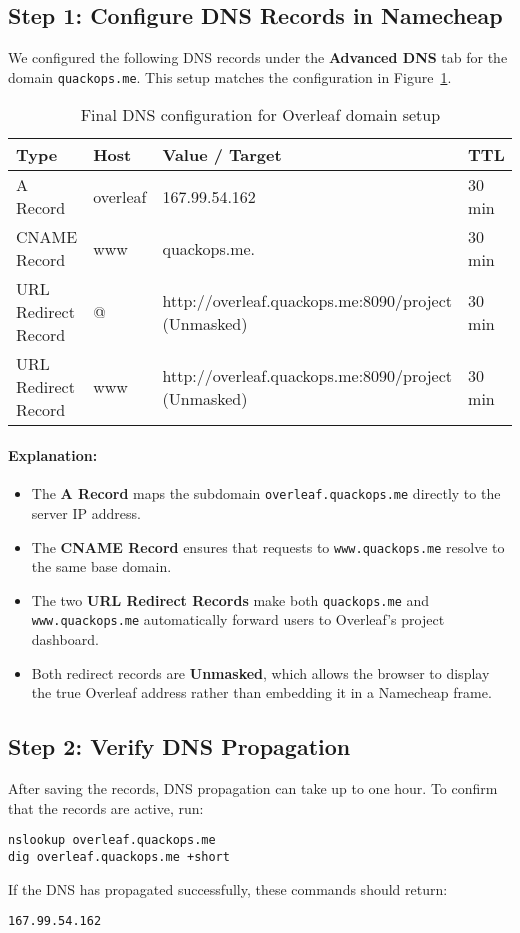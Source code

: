 \subsection{Step 1: Configure DNS Records in Namecheap}
We configured the following DNS records under the \textbf{Advanced DNS} tab for the domain \texttt{quackops.me}.  
This setup matches the configuration in Figure~\ref{fig:dns-records}.

\begin{table}[H]
\centering
\begin{tabular}{|l|l|l|l|}
\hline
\textbf{Type} & \textbf{Host} & \textbf{Value / Target} & \textbf{TTL} \\ \hline
A Record & overleaf & 167.99.54.162 & 30 min \\ \hline
CNAME Record & www & quackops.me. & 30 min \\ \hline
URL Redirect Record & @ & http://overleaf.quackops.me:8090/project (Unmasked) & 30 min \\ \hline
URL Redirect Record & www & http://overleaf.quackops.me:8090/project (Unmasked) & 30 min \\ \hline
\end{tabular}
\caption{Final DNS configuration for Overleaf domain setup}
\label{fig:dns-records}
\end{table}

\paragraph{Explanation:}
\begin{itemize}
  \item The \textbf{A Record} maps the subdomain \texttt{overleaf.quackops.me} directly to the server IP address.
  \item The \textbf{CNAME Record} ensures that requests to \texttt{www.quackops.me} resolve to the same base domain.
  \item The two \textbf{URL Redirect Records} make both \texttt{quackops.me} and \texttt{www.quackops.me} automatically forward users to Overleaf’s project dashboard.
  \item Both redirect records are \textbf{Unmasked}, which allows the browser to display the true Overleaf address rather than embedding it in a Namecheap frame.
\end{itemize}

\subsection{Step 2: Verify DNS Propagation}
After saving the records, DNS propagation can take up to one hour.  
To confirm that the records are active, run:
\begin{verbatim}
nslookup overleaf.quackops.me
dig overleaf.quackops.me +short
\end{verbatim}
If the DNS has propagated successfully, these commands should return:
\begin{verbatim}
167.99.54.162
\end{verbatim}

